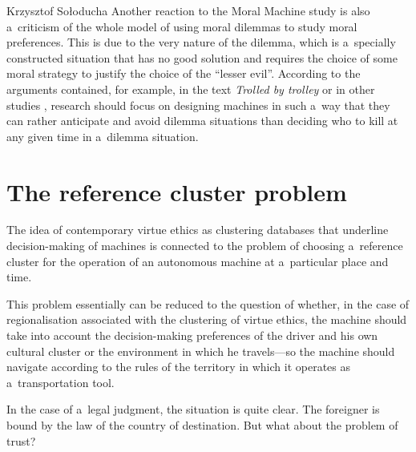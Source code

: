 \begin{artengenv}{Krzysztof Sołoducha}
Another reaction to the Moral Machine study is also a~criticism of the whole model of using moral dilemmas to study moral preferences. This is due to the very nature of the dilemma, which is a~specially constructed situation that has no good solution and requires the choice of some moral strategy to justify the choice of the ``lesser evil''. According to the arguments contained, for example, in the text \textit{Trolled by trolley}
\parencite[][]{mirnig_trolled_2019} %
 or in other studies 
\parencite[][]{holstein_avoiding_2018}, %
 research should focus on designing machines in such a~way that they can rather anticipate and avoid dilemma situations than deciding who to kill at any given time in a~dilemma situation.

\section*{The reference cluster problem}
The idea of contemporary virtue ethics as clustering databases that underline decision-making of machines is connected to the problem of choosing a~reference cluster for the operation of an autonomous machine at a~particular place and time.

This problem essentially can be reduced to the question of whether, in the case of regionalisation associated with the clustering of virtue ethics, the machine should take into account the decision-making preferences of the driver and his own cultural cluster or the environment in which he travels—so the machine should navigate according to the rules of the territory in which it operates as a~transportation tool.

In the case of a~legal judgment, the situation is quite clear. The foreigner is bound by the law of the country of destination. But what about the problem of trust?


\end{artengenv}
